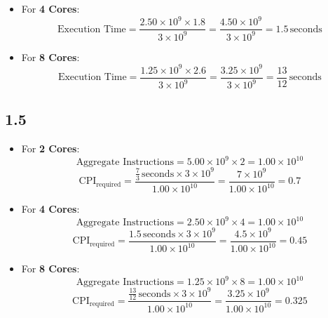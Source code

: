 \documentclass[cn,12pt]{homework}
\begin{document}
\begin{solution}
\begin{itemize}
    \item For \textbf{4 Cores}:
    \[
    \text{Execution Time} = \frac{2.50 \times 10^9 \times 1.8}{3 \times 10^9} = \frac{4.50 \times 10^9}{3 \times 10^9} = 1.5 \, \text{seconds}
    \]

    \item For \textbf{8 Cores}:
    \[
    \text{Execution Time} = \frac{1.25 \times 10^9 \times 2.6}{3 \times 10^9} = \frac{3.25 \times 10^9}{3 \times 10^9} = \frac{13}{12} \, \text{seconds}
    \]
\end{itemize}

\subsection*{1.5}

\begin{itemize}
    \item For \textbf{2 Cores}:
    \[
    \text{Aggregate Instructions} = 5.00 \times 10^9 \times 2 = 1.00 \times 10^{10}
    \]
    \[
    \text{CPI}_{\text{required}} = \frac{\frac{7}{3} \, \text{seconds} \times 3 \times 10^9}{1.00 \times 10^{10}} = \frac{7 \times 10^9}{1.00 \times 10^{10}} = 0.7
    \]

    \item For \textbf{4 Cores}:
    \[
    \text{Aggregate Instructions} = 2.50 \times 10^9 \times 4 = 1.00 \times 10^{10}
    \]
    \[
    \text{CPI}_{\text{required}} = \frac{1.5 \, \text{seconds} \times 3 \times 10^9}{1.00 \times 10^{10}} = \frac{4.5 \times 10^9}{1.00 \times 10^{10}} = 0.45
    \]

    \item For \textbf{8 Cores}:
    \[
    \text{Aggregate Instructions} = 1.25 \times 10^9 \times 8 = 1.00 \times 10^{10}
    \]
    \[
    \text{CPI}_{\text{required}} = \frac{\frac{13}{12} \, \text{seconds} \times 3 \times 10^9}{1.00 \times 10^{10}} = \frac{3.25 \times 10^9}{1.00 \times 10^{10}} = 0.325
    \]
\end{itemize}

\end{solution}
\newpage




\end{document}
